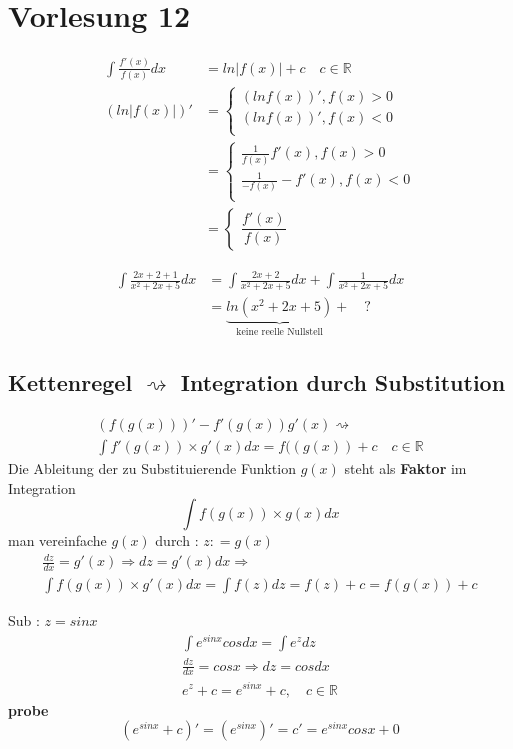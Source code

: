 \section{Vorlesung 12}
\begin{align*}
\int \frac{f'(x)}{f(x)}dx &= ln |f(x)| + c \quad c \in \mathbb{R} \\
( ln | f(x)| )'   &= 
\begin{cases} 
(ln f(x))' , f(x)> 0 \\
(ln f(x))' , f(x)< 0 \\ 
\end{cases}\\
&=
\begin{cases}
\frac{1}{f(x)}f'(x),f(x) >0 \\
\frac{1}{-f(x)}-f'(x),f(x) < 0\\
\end{cases} \\
&= 
\begin{cases}
\dfrac{f'(x)}{f(x)}
\end{cases}
\end{align*}
\begin{example}
\begin{align*}
\int{\frac{ 2x +2 +1 }{ x^2 + 2x +5} dx }
&= \int{\frac{ 2x + 2  }{ x^2 + 2x +5} dx } + 
\int{\frac{1}{ x^2 + 2x +5} dx }\\
 &= \underbrace{ln(x^2 + 2x + 5)}_{\text{keine reelle Nullstell}}  + \quad ? 
\end{align*}
\subsection{Kettenregel $\rightsquigarrow$ Integration durch \textbf{Substitution}}
\end{example}
\begin{align*}
(f(g(x)))' - f'(g(x))g'(x) \rightsquigarrow \\
\int f'(g(x)) \times g'(x)dx = f((g(x)) + c \quad c \in \mathbb{R} 
\end{align*}
Die Ableitung der zu Substituierende Funktion $g(x)$ steht als \textbf{Faktor} im Integration
$$ \int{ f(g(x)) \times g(x) dx } $$
man vereinfache $g(x)$ durch : $z : = g(x)$
\begin{gather*}
\frac{dz}{dx} = g'(x) \Rightarrow dz = g'(x)dx \Rightarrow \\
\int{f(g(x)) \times g'(x)dx} = \int f(z)dz  = f(z) + c = f(g(x)) + c 
\end{gather*}
\begin{example}
Sub : $z = sinx$
\begin{align*}
\int {e^{sinx} cos} dx = \int e^z dz\\
\frac{dz}{dx} = cos x \Rightarrow dz = cos dx\\
 e^z + c = e^{sin x } + c, \quad c \in \mathbb{R}
\end{align*}
\textbf{probe}
$$ (e^{sinx} + c)' = (e^{sinx})' = c' = e^{sinx} cosx + 0 $$
\end{example}
